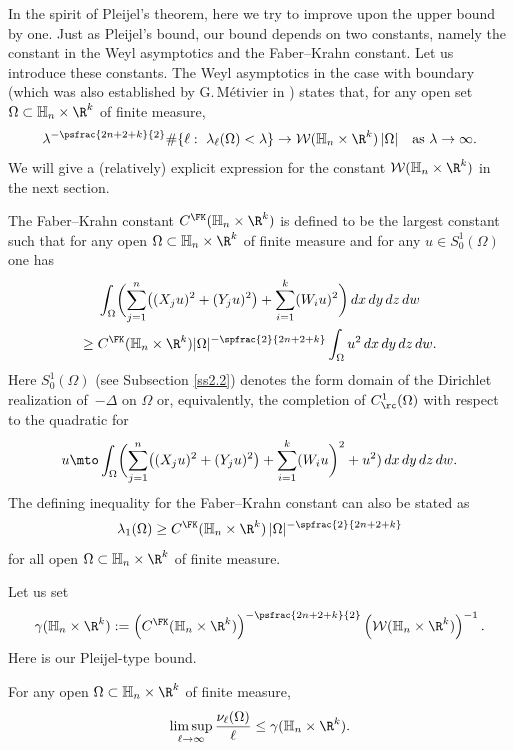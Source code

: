 In the spirit of Pleijel's theorem, here we try to improve upon the upper bound by one. Just as Pleijel's bound, our bound depends on two constants, namely the constant in the Weyl asymptotics and the Faber--Krahn constant. Let us introduce these constants. The Weyl asymptotics in the case with boundary (which was also established by G.\,Métivier in \cite[Th.\,1.3]{Me}) states
that, for any open set $\Omega\subset\mathbb H_n\times\R^k$ of finite measure,
\begin{equation}\label{Metwithbdry}
\lambda^{-\psfrac{2n+2+k}{2}} \#\{ \ell:\ \lambda_\ell(\Omega)<\lambda \} \to \mathcal W(\mathbb H_n\times\R^k) \,|\Omega|
\quad\text{as}\ \lambda\to\infty.
\end{equation}
We will give a (relatively) explicit expression for the constant $\mathcal W(\mathbb H_n\times\R^k)$ in the next section.

The Faber--Krahn constant $C^\FK(\mathbb H_n\times\R^k)$ is defined to be the largest constant such that for any open $\Omega\subset\mathbb H_n\times\R^k$ of finite measure and for any $u\in S^1_0(\Omega)$ one has
\begin{multline}
\label{eq:fk}
\int_\Omega \biggl(\sum_{j=1}^n \bigl((X_ju)^2 + (Y_ju)^2\bigr) + \sum_{i=1}^k (W_iu)^2\biggr)\,dx\,dy\,dz\,dw \\
\geq C^\FK(\mathbb H_n\times\R^k) |\Omega|^{-\spfrac{2}{2n+2+k}} \int_\Omega u^2 \,dx\,dy\,dz\,dw.
\end{multline}
Here $S^1_0(\Omega)$ (see Subsection \ref{ss2.2}) denotes the form domain of the Dirichlet realization of~$-\Delta$ on $\Omega$ or, equivalently, the completion of $C^1_\rc(\Omega)$ with respect to the quadratic for
\[u \mto \int_\Omega \biggl(\sum_{j=1}^n \bigl((X_ju)^2 + (Y_ju)^2 \bigr) + \sum_{i=1}^k (W_iu \biggr)^2 + u^2)\,dx\,dy\,dz\,dw.
\]
The defining inequality for the Faber--Krahn constant can also be stated as
\[
\lambda_1(\Omega) \geq C^\FK(\mathbb H_n\times\R^k) \,|\Omega|^{-\spfrac{2}{2n+2+k}}
\]
for all open $\Omega\subset\mathbb H_n\times\R^k$ of finite measure.

Let us set
\begin{equation}\label{eq:defgamma}
\gamma(\mathbb H_n\times\R^k) := \left(C^\FK(\mathbb H_n\times\R^k)\right)^{-\psfrac{2n+2+k}{2}} \left(\mathcal W(\mathbb H_n\times\R^k)\right)^{-1}.
\end{equation}
Here is our Pleijel-type bound.

\begin{theorem}\label{pleijelnk}
For any open $\Omega\subset\mathbb H_n\times\R^k$ of finite measure,
\[
\limsup_{\ell\to\infty} \frac{\nu_\ell(\Omega)}{\ell} \leq \gamma(\mathbb H_n\times\R^k).
\]
\end{theorem}

